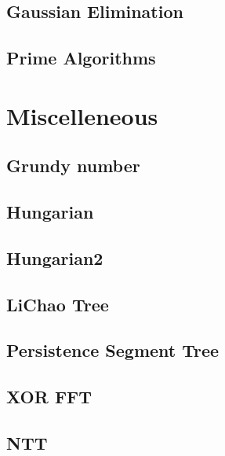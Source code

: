 \documentclass[10pt,landscape,a4paper,twocolumn]{article}
\begin{document}
\subsection{Gaussian Elimination}


\subsection{Prime Algorithms}



\section{Miscelleneous}
\subsection{Grundy number}


\subsection{Hungarian}


\subsection{Hungarian2}


\subsection{LiChao Tree}


\subsection{Persistence Segment Tree}


\subsection{XOR FFT}


\subsection{NTT}

\end{document}
